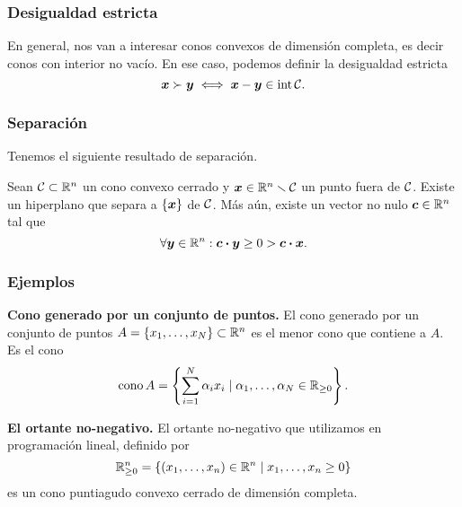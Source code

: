 \documentclass[aspectratio=169,12pt,spanish]{beamer}
\begin{document}

\begin{frame}
\frametitle{Desigualdad estricta}

En general, nos van a interesar conos convexos de dimensión completa, es decir conos con interior no vacío. En ese caso, podemos definir la desigualdad estricta
$$
\bm{x} \succ \bm{y} \iff \bm{x} - \bm{y} \in \operatorname{int} \mathcal{C}.
$$

\end{frame}




\begin{frame}
\frametitle{Separación}

Tenemos el siguiente resultado de separación.

\begin{lemma} Sean $\mathcal{C} \subset \mathbb{R}^n$ un cono convexo cerrado y $\bm{x} \in \mathbb{R}^n \smallsetminus \mathcal{C}$ un punto fuera de $\mathcal{C}$. Existe un hiperplano que separa a $\{\bm{x}\}$ de $\mathcal{C}$. Más aún, existe un vector no nulo $\bm{c} \in \mathbb{R}^n$ tal que
$$
\forall \bm{y} \in \mathbb{R}^n : \bm{c} \boldsymbol{\cdot} \bm{y} \ge 0 > \bm{c} \boldsymbol{\cdot} \bm{x}.
$$
\end{lemma}

\end{frame}


\begin{frame}
\frametitle{Ejemplos}

\noindent\textbf{Cono generado por un conjunto de puntos.}
El cono generado por un conjunto de puntos $A = \{x_1, \dots, x_N\} \subset \mathbb{R}^n$ es el menor cono que contiene a $A$. Es el cono
$$
\operatorname{cono} A = \left\{ \sum_{i=1}^N \alpha_i x_i \mid \alpha_1, \dots, \alpha_N \in \mathbb{R}_{\ge 0}\right\}.
$$

\noindent\textbf{El ortante no-negativo.}
El ortante no-negativo que utilizamos en programación lineal, definido por
$$
\mathbb{R}^n_{\ge 0} = \{(x_1, \dots, x_n) \in \mathbb{R}^n \mid x_1, \dots, x_n \ge 0\}
$$
es un cono puntiagudo convexo cerrado de dimensión completa.

\end{frame}

\end{document}

